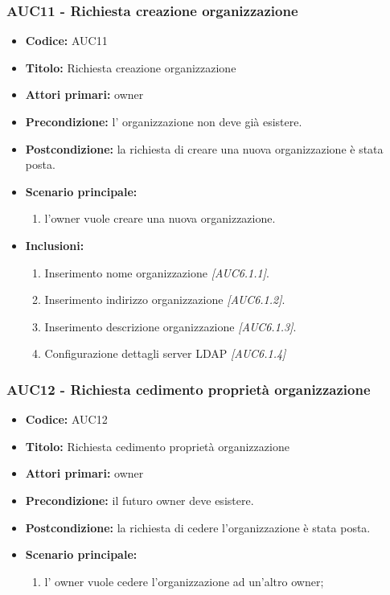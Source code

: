 \documentclass[casi-duso]{subfiles}
\begin{document}
\subsubsection{AUC11 - Richiesta creazione organizzazione}%
\label{subsub:AUC11}
\begin{itemize}
  \item \textbf{Codice:} AUC11
  \item \textbf{Titolo:} Richiesta creazione organizzazione
  \item \textbf{Attori primari:} owner
  \item \textbf{Precondizione:} l' organizzazione non deve già esistere.
  \item \textbf{Postcondizione:} la richiesta di creare una nuova organizzazione è stata posta.
  \item \textbf{Scenario principale:}
  \begin{enumerate}
    \item l'owner vuole creare una nuova organizzazione.
  \end{enumerate}
  \item \textbf{Inclusioni:}
  \begin{enumerate}
    \item Inserimento nome organizzazione \emph{[AUC6.1.1]}.
    \item Inserimento indirizzo organizzazione \emph{[AUC6.1.2]}.
    \item Inserimento descrizione organizzazione \emph{[AUC6.1.3]}.
    \item Configurazione dettagli server LDAP \emph{[AUC6.1.4]}
  \end{enumerate}
\end{itemize}

\subsubsection{AUC12 - Richiesta cedimento proprietà organizzazione}%
\label{subsub:AUC12}
\begin{itemize}
  \item \textbf{Codice:} AUC12
  \item \textbf{Titolo:} Richiesta cedimento proprietà organizzazione
  \item \textbf{Attori primari:} owner
  \item \textbf{Precondizione:} il futuro owner deve esistere.
  \item \textbf{Postcondizione:} la richiesta di cedere l'organizzazione è stata posta.
  \item \textbf{Scenario principale:} 
  \begin{enumerate}
    \item l' owner vuole cedere l'organizzazione ad un'altro owner;
  \end{enumerate}
\end{itemize}
\end{document}
